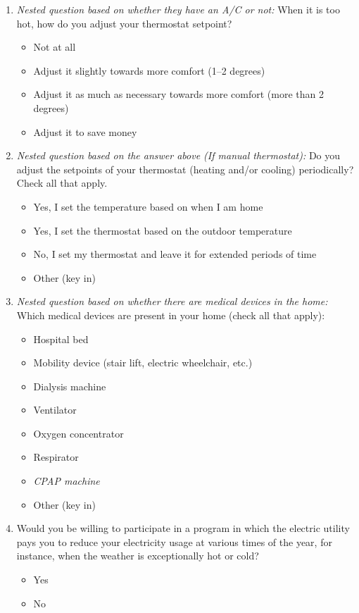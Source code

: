 \documentclass{article}
\begin{document}
\begin{enumerate}
\item \textit{Nested question based on whether they have an A/C or not:}
When it is too hot, how do you adjust your thermostat setpoint?
\begin{itemize}
  \item[\checkbox] Not at all
  \item[\checkbox] Adjust it slightly towards more comfort (1--2 degrees)
  \item[\checkbox] Adjust it as much as necessary towards more comfort (more than 2 degrees)
  \item[\checkbox] Adjust it to save money
\end{itemize}
 

\item \textit{Nested question based on the answer above (If manual thermostat):}
Do you adjust the setpoints of your thermostat (heating and/or cooling) periodically? Check all that apply.
\begin{itemize}
  \item[\checkbox] Yes, I set the temperature based on when I am home
  \item[\checkbox] Yes, I set the thermostat based on the outdoor temperature
  \item[\checkbox] No, I set my thermostat and leave it for extended periods of time
  \item[\checkbox] Other (key in)
\end{itemize}
 

\item \textit{Nested question based on whether there are medical devices in the home:}
Which medical devices are present in your home (check all that apply):
\begin{itemize}
  \item[\checkbox] Hospital bed
  \item[\checkbox] Mobility device (stair lift, electric wheelchair, etc.)
  \item[\checkbox] Dialysis machine
  \item[\checkbox] Ventilator
  \item[\checkbox] Oxygen concentrator
  \item[\checkbox] Respirator
  \item[\checkbox] \textit{CPAP machine}
  \item[\checkbox] Other (key in)
\end{itemize}
 

\item Would you be willing to participate in a program in which the electric utility pays you to reduce your electricity usage at various times of the year, for instance, when the weather is exceptionally hot or cold?
\begin{itemize}
  \item[\checkbox] Yes
  \item[\checkbox] No
\end{itemize}
 


\end{enumerate}
\end{document}
